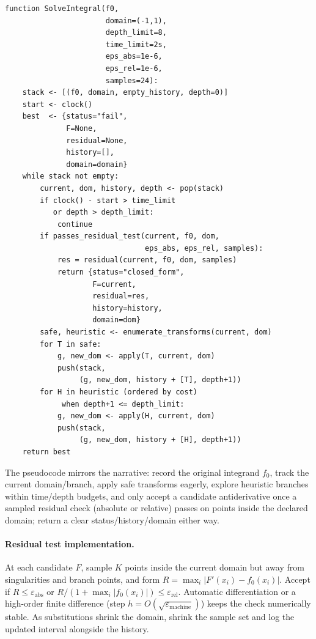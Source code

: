     \begin{tcolorbox}[summarybox, breakable, title={Transformation-tree search (pseudocode)}]
\footnotesize
\begin{verbatim}
function SolveIntegral(f0,
                       domain=(-1,1),
                       depth_limit=8,
                       time_limit=2s,
                       eps_abs=1e-6,
                       eps_rel=1e-6,
                       samples=24):
    stack <- [(f0, domain, empty_history, depth=0)]
    start <- clock()
    best  <- {status="fail",
              F=None,
              residual=None,
              history=[],
              domain=domain}
    while stack not empty:
        current, dom, history, depth <- pop(stack)
        if clock() - start > time_limit
           or depth > depth_limit:
            continue
        if passes_residual_test(current, f0, dom,
                                eps_abs, eps_rel, samples):
            res = residual(current, f0, dom, samples)
            return {status="closed_form",
                    F=current,
                    residual=res,
                    history=history,
                    domain=dom}
        safe, heuristic <- enumerate_transforms(current, dom)
        for T in safe:
            g, new_dom <- apply(T, current, dom)
            push(stack,
                 (g, new_dom, history + [T], depth+1))
        for H in heuristic (ordered by cost)
             when depth+1 <= depth_limit:
            g, new_dom <- apply(H, current, dom)
            push(stack,
                 (g, new_dom, history + [H], depth+1))
    return best
\end{verbatim}
\normalsize
The pseudocode mirrors the narrative: record the original integrand \(f_0\), track the current domain/branch, apply safe transforms eagerly, explore heuristic branches within time/depth budgets, and only accept a candidate antiderivative once a sampled residual check (absolute or relative) passes on points inside the declared domain; return a clear status/history/domain either way.

\paragraph{Residual test implementation.} At each candidate \(F\), sample \(K\) points inside the current domain but away from singularities and branch points, and form \(R=\max_i |F'(x_i)-f_0(x_i)|\). Accept if \(R \le \varepsilon_{\text{abs}}\) or \(R/(1+\max_i |f_0(x_i)|)\le \varepsilon_{\text{rel}}\). Automatic differentiation or a high-order finite difference (step \(h=O(\sqrt{\varepsilon_{\text{machine}}})\)) keeps the check numerically stable. As substitutions shrink the domain, shrink the sample set and log the updated interval alongside the history.
\end{tcolorbox}

